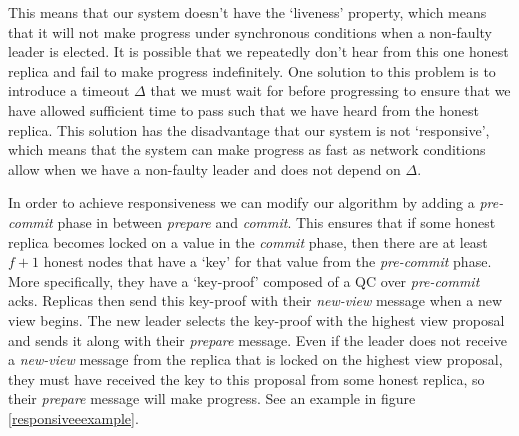 This means that our system doesn't have the `liveness' property, which means that it will not make progress under synchronous conditions when a non-faulty leader is elected. It is possible that we repeatedly don't hear from this one honest replica and fail to make progress indefinitely. One solution to this problem is to introduce a timeout $\Delta$ that we must wait for before progressing to ensure that we have allowed sufficient time to pass such that we have heard from the honest replica. This solution has the disadvantage that our system is not `responsive', which means that the system can make progress as fast as network conditions allow when we have a non-faulty leader and does not depend on $\Delta$.

In order to achieve responsiveness we can modify our algorithm by adding a \textit{pre-commit} phase in between \textit{prepare} and \textit{commit}. This ensures that if some honest replica becomes locked on a value in the \textit{commit} phase, then there are at least $f + 1$ honest nodes that have a `key' for that value from the \textit{pre-commit} phase. More specifically, they have a `key-proof' composed of a QC over \textit{pre-commit} acks. Replicas then send this key-proof with their \textit{new-view} message when a new view begins. The new leader selects the key-proof with the highest view proposal and sends it along with their \textit{prepare} message. Even if the leader does not receive a \textit{new-view} message from the replica that is locked on the highest view proposal, they must have received the key to this proposal from some honest replica, so their \textit{prepare} message will make progress. See an example in figure \ref{responsiveeexample}.

